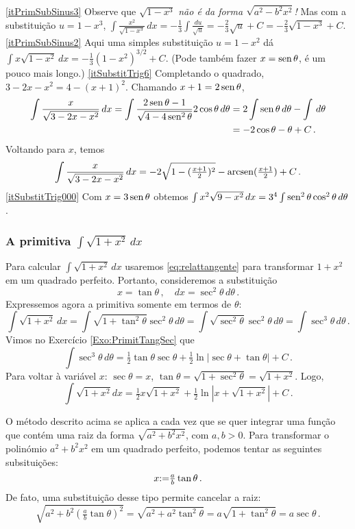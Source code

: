 \begin{exo}
\begin{sol}
$$$$
\eqref{itPrimSubSinus3} Observe que $\sqrt{1-x^3}$ \emph{não é da forma
$\sqrt{a^2-b^2x^2}$!} Mas com a substituição $u=1-x^3$, 
$\int \frac{x^2}{\sqrt{1-x^3}}\,dx=-\tfrac13\int
\frac{du}{\sqrt{u}}=-\tfrac23\sqrt{u}+C=-\tfrac23\sqrt{1-x^3}+C$.
\eqref{itPrimSubSinus2} Aqui uma simples substituição $u=1-x^2$ dá
$\int x\sqrt{1-x^2}\,dx=-\tfrac13(1-x^2)^{3/2}+C$. (Pode também fazer $x=\operatorname{sen}
\theta$, é um pouco mais longo.)
\eqref{itSubstitTrig6} Completando o quadrado, 
$3-2x-x^2=4-(x+1)^2$. Chamando $x+1=2\operatorname{sen} \theta$,
\begin{align*}
\int\frac{x}{\sqrt{3-2x-x^2}}\,dx=\int\frac{2\operatorname{sen}
\theta-1}{\sqrt{4-4\operatorname{sen}^2\theta}}2\cos \theta\,d\theta&=
2\int \operatorname{sen} \theta\,d\theta-\int \,d\theta\\
&=-2\cos\theta-\theta+C\,.
\end{align*}
Voltando para $x$, temos
$$
\int\frac{x}{\sqrt{3-2x-x^2}}\,dx=-2\sqrt{1-(\tfrac{x+1}{2})^2}
-\operatorname{arcsen}(\tfrac{x+1}{2})+C\,.$$
\eqref{itSubstitTrig000} Com $x=3\operatorname{sen} \theta$ obtemos 
$\int x^2{\sqrt{9-x^2}}\,dx=3^4\int \operatorname{sen}^2\theta\cos^2\theta\,d\theta$.
\end{sol}
\end{exo}


\subsubsection{A primitiva $\int \sqrt{1+x^2}\,dx$}

Para calcular $\int \sqrt{1+x^2}\,dx$
usaremos \eqref{eq:relattangente} para
transformar $1+x^2$ em um quadrado perfeito.
Portanto, consideremos a substituição 
$$x=\tan \theta\,,\quad dx=\sec^2 \theta\,d\theta\,.$$
Expressemos agora a primitiva somente em termos de $\theta$:
$$
\int \sqrt{1+x^2}\,dx=\int \sqrt{1+\tan^2\theta}\sec^2 \theta\,d\theta=
\int \sqrt{\sec^2\theta}\sec^2\theta\,d\theta=\int \sec^3\theta\,d\theta\,.
$$
Vimos no Exercício \ref{Exo:PrimitTangSec} que
$$
\int\sec^3\theta\,d\theta=
\tfrac12\tan\theta\sec\theta+\tfrac12\ln\bigl|\sec\theta+\tan
\theta\bigr|+C\,.
$$
Para voltar à variável $x$: $\sec\theta=x$,
$\tan\theta=\sqrt{1+\sec^2\theta}=\sqrt{1+x^2}$.
Logo,
$$\boxed{\int \sqrt{1+x^2}dx=\tfrac12
x\sqrt{1+x^2}+\tfrac12 \ln |x+\sqrt{1+x^2}|
+C\,.}$$

O método descrito acima se aplica a cada vez que se quer integrar uma função 
que contém uma raiz da forma $\sqrt{a^2+b^2x^2}$, com $a,b>0$.
Para transformar o polinómio $a^2+b^2x^2$ em um quadrado perfeito, podemos
tentar as seguintes subsituições: 
$$x{:=} \tfrac{a}{b}\tan \theta \,.$$
De fato, uma substituição desse tipo permite cancelar a raiz:
$$
\sqrt{a^2+b^2(\tfrac{a}{b}\tan \theta)^2}=
\sqrt{a^2+a^2\tan^2\theta}=a\sqrt{1+\tan^2\theta}=a\sec \theta\,.
$$

